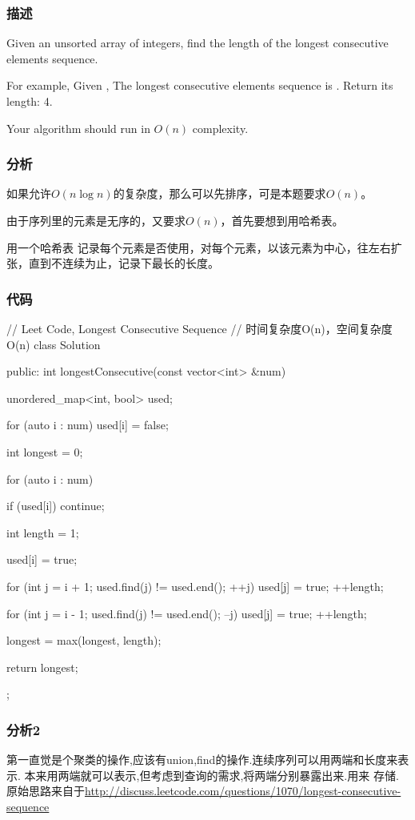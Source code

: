 \subsubsection{描述}
Given an unsorted array of integers, find the length of the longest consecutive 
elements sequence.

For example,
Given \code{[100, 4, 200, 1, 3, 2]},
The longest consecutive elements sequence is \code{[1, 2, 3, 4]}. Return its 
length: 4.

Your algorithm should run in $O(n)$ complexity.


\subsubsection{分析}
如果允许$O(n \log n)$的复杂度，那么可以先排序，可是本题要求$O(n)$。

由于序列里的元素是无序的，又要求$O(n)$，首先要想到用哈希表。

用一个哈希表 记录每个元素是否使用，对每个元素，以该元素为中心，往左右扩张，直到不连续为止，记录下最长的长度。


\subsubsection{代码}
\begin{Code}
	// Leet Code, Longest Consecutive Sequence
	// 时间复杂度O(n)，空间复杂度O(n)
	class Solution {
		public:
		int longestConsecutive(const vector<int> &num) {
			unordered_map<int, bool> used;
			
			for (auto i : num) used[i] = false;
			
			int longest = 0;
			
			for (auto i : num) {
				if (used[i]) continue;
				
				int length = 1;
				
				used[i] = true;
				
				for (int j = i + 1; used.find(j) != used.end(); ++j) {
					used[j] = true;
					++length;
				}
				
				for (int j = i - 1; used.find(j) != used.end(); --j) {
					used[j] = true;
					++length;
				}
				
				longest = max(longest, length);
			}
			
			return longest;
		}
	};
\end{Code}

\subsubsection{分析2}
第一直觉是个聚类的操作,应该有union,find的操作.连续序列可以用两端和长度来表示.
本来用两端就可以表示,但考虑到查询的需求,将两端分别暴露出来.用来
存储.原始思路来自于\url{http://discuss.leetcode.com/questions/1070/longest-consecutive-sequence}

